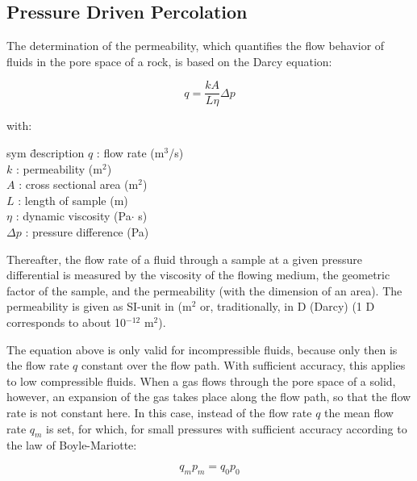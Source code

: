 \subsection{Pressure Driven Percolation}

The determination of the permeability, which quantifies the flow behavior of fluids in the pore space of a rock, is based on the Darcy equation:

\begin{equation}
q = \frac{kA}{L\eta}\Delta p
\end{equation}

with:
\begin{tabbing}
sym \= description \kill
$q$ : \> flow rate (m$^3$/s) \\
$k$ : \> permeability (m$^2$) \\
$A$ : \> cross sectional area (m$^2$) \\
$L$ : \> length of sample (m) \\
$\eta$ : \> dynamic viscosity (Pa$\cdot$ s) \\
$\Delta p$ : \> pressure difference (Pa)
\end{tabbing}

Thereafter, the flow rate of a fluid through a sample at a given pressure differential is measured by the viscosity of the flowing medium, the geometric factor of the sample, and the permeability (with the dimension of an area). The permeability is given as SI-unit in (m$^2$ or, traditionally, in D (Darcy) (1 D corresponds to about 10$^{-12}$ m$^2$).

The equation above is only valid for incompressible fluids, because only then is the flow rate $q$ constant over the flow path. With sufficient accuracy, this applies to low compressible fluids.
When a gas flows through the pore space of a solid, however, an expansion of the gas takes place along the flow path, so that the flow rate is not constant here. In this case, instead of the flow rate $q$ the mean flow rate $q_m$ is set, for which, for small pressures with sufficient accuracy according to the law of Boyle-Mariotte:

\begin{equation}
q_m p_m = q_0 p_0
\end{equation}

